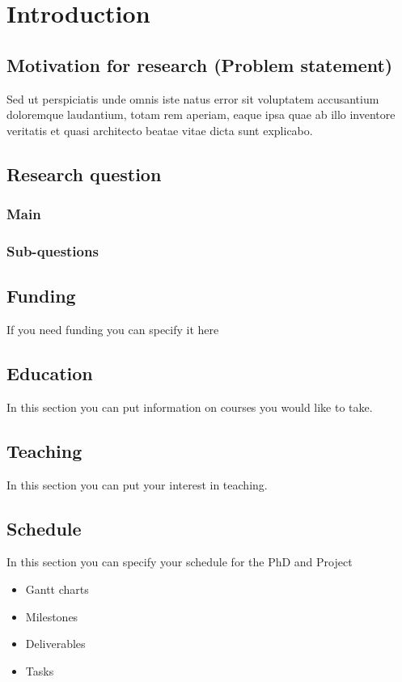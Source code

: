 \chapter{Introduction}
\label{chap:1.1}
\section{ Motivation for research (Problem statement)}
Sed ut perspiciatis unde omnis iste natus error sit voluptatem accusantium doloremque laudantium, totam rem aperiam, eaque ipsa quae ab illo inventore veritatis et quasi architecto beatae vitae dicta sunt explicabo. 

\section{Research question}
\subsection{Main}
\subsection{Sub-questions}

\section{Funding}
If you need funding you can specify it here
\section{Education}
In this section you can put information on courses you would like to take. 
\section{Teaching}
In this section you can put your interest in teaching.
\section{Schedule}
In this section you can specify your schedule for the PhD and Project
\begin{itemize}
	\item Gantt charts
	\item Milestones
	\item Deliverables
	\item Tasks
\end{itemize}
